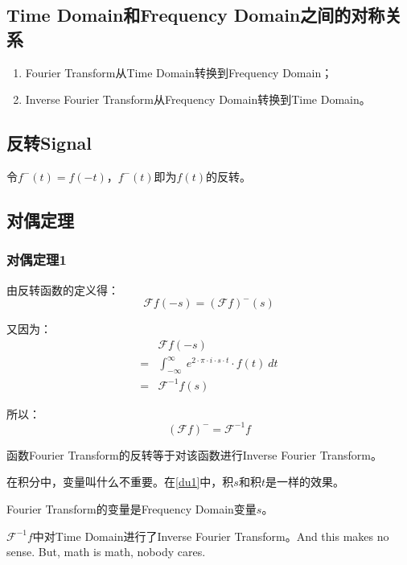 \subsection{Time Domain和Frequency Domain之间的对称关系}
\begin{enumerate}
	\item Fourier Transform从Time Domain转换到Frequency Domain；
	\item Inverse Fourier Transform从Frequency Domain转换到Time Domain。
\end{enumerate}
\subsection{反转Signal}
令$f^-(t)=f(-t)$，$f^-(t)$即为$f(t)$的反转。

\subsection{对偶定理}
\subsubsection{对偶定理1}
由反转函数的定义得：
$$
	\mathcal{F}f(-s)=(\mathcal{F}f)^-(s)
$$

又因为：
\begin{align*}
	  & \mathcal{F}f(-s)                                                           \\
	= & \int_{-\infty}^{\infty}\ e^{2\cdot \pi\cdot i\cdot s\cdot t}\cdot f(t)\ dt \\
	= & \mathcal{F}^{-1}f(s)
\end{align*}

所以：
\begin{equation}\label{du1}
	(\mathcal{F}f)^-=\mathcal{F}^{-1}f
\end{equation}

函数Fourier Transform的反转等于对该函数进行Inverse Fourier Transform。

在积分中，变量叫什么不重要。在\eqref{du1}中，积$s$和积$t$是一样的效果。

Fourier Transform的变量是Frequency Domain变量$s$。

$\mathcal{F}^{-1}f$中对Time Domain进行了Inverse Fourier Transform。And this makes no sense. But, math is math, nobody cares.

